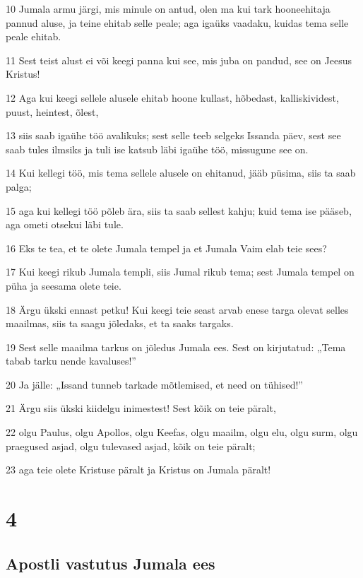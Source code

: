 \par 10 Jumala armu järgi, mis minule on antud, olen ma kui tark hooneehitaja pannud aluse, ja teine ehitab selle peale; aga igaüks vaadaku, kuidas tema selle peale ehitab.
\par 11 Sest teist alust ei või keegi panna kui see, mis juba on pandud, see on Jeesus Kristus!
\par 12 Aga kui keegi sellele alusele ehitab hoone kullast, hõbedast, kalliskividest, puust, heintest, õlest,
\par 13 siis saab igaühe töö avalikuks; sest selle teeb selgeks Issanda päev, sest see saab tules ilmsiks ja tuli ise katsub läbi igaühe töö, missugune see on.
\par 14 Kui kellegi töö, mis tema sellele alusele on ehitanud, jääb püsima, siis ta saab palga;
\par 15 aga kui kellegi töö põleb ära, siis ta saab sellest kahju; kuid tema ise pääseb, aga ometi otsekui läbi tule.
\par 16 Eks te tea, et te olete Jumala tempel ja et Jumala Vaim elab teie sees?
\par 17 Kui keegi rikub Jumala templi, siis Jumal rikub tema; sest Jumala tempel on püha ja seesama olete teie.
\par 18 Ärgu ükski ennast petku! Kui keegi teie seast arvab enese targa olevat selles maailmas, siis ta saagu jõledaks, et ta saaks targaks.
\par 19 Sest selle maailma tarkus on jõledus Jumala ees. Sest on kirjutatud: „Tema tabab tarku nende kavaluses!”
\par 20 Ja jälle: „Issand tunneb tarkade mõtlemised, et need on tühised!”
\par 21 Ärgu siis ükski kiidelgu inimestest! Sest kõik on teie päralt,
\par 22 olgu Paulus, olgu Apollos, olgu Keefas, olgu maailm, olgu elu, olgu surm, olgu praegused asjad, olgu tulevased asjad, kõik on teie päralt;
\par 23 aga teie olete Kristuse päralt ja Kristus on Jumala päralt!


\chapter{4}

\section*{Apostli vastutus Jumala ees}

